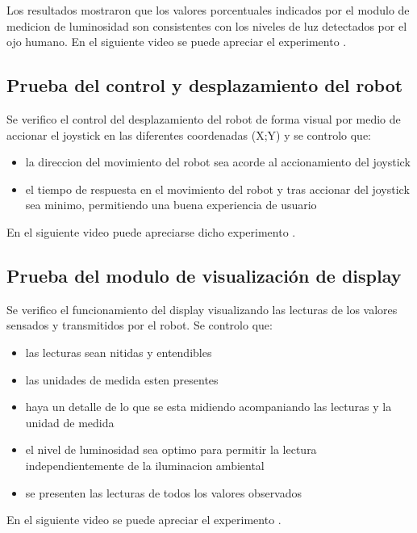 Los resultados mostraron que los valores porcentuales indicados por el modulo de medicion de luminosidad son consistentes con los niveles de luz detectados por el ojo humano. En el siguiente video se puede apreciar el experimento \cite{Video_Prueba_Luminosidad}.

\subsection{Prueba del control y desplazamiento del robot}

Se verifico el control del desplazamiento del robot de forma visual por medio de accionar el joystick en las diferentes coordenadas (X;Y) y se controlo que:

\begin{itemize}
	\item la direccion del movimiento del robot sea acorde al accionamiento del joystick
	\item el tiempo de respuesta en el movimiento del robot y tras accionar del joystick sea minimo, permitiendo una buena experiencia de usuario
\end{itemize}

En el siguiente video puede apreciarse dicho experimento \cite{Video_Prueba_Movimiento}. 


\subsection{Prueba del modulo de visualización de display}

Se verifico el funcionamiento del display visualizando las lecturas de los valores sensados y transmitidos por el robot. Se controlo que: 

\begin{itemize}
	\item las lecturas sean nitidas y entendibles
	\item las unidades de medida esten presentes
	\item haya un detalle de lo que se esta midiendo acompaniando las lecturas y la unidad de medida
	\item el nivel de luminosidad sea optimo para permitir la lectura independientemente de la iluminacion ambiental
	\item se presenten las lecturas de todos los valores observados 
\end{itemize}

En el siguiente video se puede apreciar el experimento \cite{Video_Prueba_Visualizacion_Display}.

